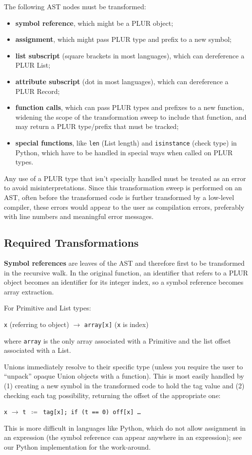 \documentclass[10pt, conference, compsocconf]{IEEEtran}
\begin{document}
The following AST nodes must be transformed:
\begin{itemize}
\item {\bf symbol reference}, which might be a PLUR object;
\item {\bf assignment}, which might pass PLUR type and prefix to a new symbol;
\item {\bf list subscript} (square brackets in most languages), which can dereference a PLUR List;
\item {\bf attribute subscript} (dot in most languages), which can dereference a PLUR Record;
\item {\bf function calls}, which can pass PLUR types and prefixes to a new function, widening the scope of the transformation sweep to include that function, and may return a PLUR type/prefix that must be tracked;
\item {\bf special functions}, like {\tt len} (List length) and {\tt isinstance} (check type) in Python, which have to be handled in special ways when called on PLUR types.
\end{itemize}

Any use of a PLUR type that isn't specially handled must be treated as an error to avoid misinterpretations. Since this transformation sweep is performed on an AST, often before the transformed code is further transformed by a low-level compiler, these errors would appear to the user as compilation errors, preferably with line numbers and meaningful error messages.

\subsection{Required Transformations}

{\bf Symbol references} are leaves of the AST and therefore first to be transformed in the recursive walk. In the original function, an identifier that refers to a PLUR object becomes an identifier for its integer index, so a symbol reference becomes array extraction.

For Primitive and List types:
\begin{center}
{\tt x} (referring to object) $\to$ {\tt array[x]} ({\tt x} is index)
\end{center}
where {\tt array} is the only array associated with a Primitive and the list offset associated with a List.

Unions immediately resolve to their specific type (unless you require the user to ``unpack'' opaque Union objects with a function). This is most easily handled by (1) creating a new symbol in the transformed code to hold the tag value and (2) checking each tag possibility, returning the offset of the appropriate one:
\begin{center}
{\tt x} $\to$ {\tt t $\coloneqq$ tag[x]; if (t == 0) off[x] \ldots}
\end{center}
This is more difficult in languages like Python, which do not allow assignment in an expression (the symbol reference can appear anywhere in an expression); see our Python implementation\cite{plur} for the work-around.
\end{document}
